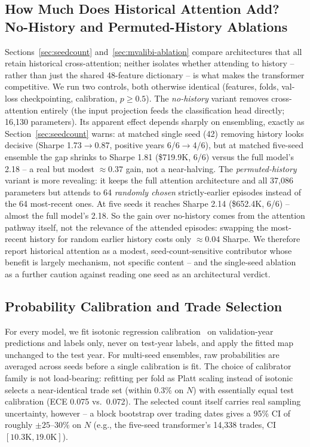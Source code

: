 \documentclass[sigconf,review,anonymous]{acmart}
\begin{document}
\subsection{How Much Does Historical Attention Add? No-History and Permuted-History Ablations}
\label{sec:nohistory}
Sections~\ref{sec:seedcount} and~\ref{sec:mvalibi-ablation} compare architectures that all retain historical cross-attention; neither isolates whether attending to history -- rather than just the shared 48-feature dictionary -- is what makes the transformer competitive. We run two controls, both otherwise identical (features, folds, val-loss checkpointing, calibration, $p\ge0.5$). The \emph{no-history} variant removes cross-attention entirely (the input projection feeds the classification head directly; 16{,}130 parameters). Its apparent effect depends sharply on ensembling, exactly as Section~\ref{sec:seedcount} warns: at matched single seed (42) removing history looks decisive (Sharpe 1.73$\to$0.87, positive years 6/6$\to$4/6), but at matched five-seed ensemble the gap shrinks to Sharpe 1.81 (\$719.9K, 6/6) versus the full model's 2.18 -- a real but modest $\approx0.37$ gain, not a near-halving. The \emph{permuted-history} variant is more revealing: it keeps the full attention architecture and all 37{,}086 parameters but attends to 64 \emph{randomly chosen} strictly-earlier episodes instead of the 64 most-recent ones. At five seeds it reaches Sharpe 2.14 (\$652.4K, 6/6) -- almost the full model's 2.18. So the gain over no-history comes from the attention pathway itself, not the relevance of the attended episodes: swapping the most-recent history for random earlier history costs only $\approx0.04$ Sharpe. We therefore report historical attention as a modest, seed-count-sensitive contributor whose benefit is largely mechanism, not specific content -- and the single-seed ablation as a further caution against reading one seed as an architectural verdict.

\subsection{Probability Calibration and Trade Selection}
\label{sec:calibration}
For every model, we fit isotonic regression calibration~\cite{zadrozny2002transforming} on validation-year predictions and labels only, never on test-year labels, and apply the fitted map unchanged to the test year. For multi-seed ensembles, raw probabilities are averaged across seeds before a single calibration is fit. The choice of calibrator family is not load-bearing: refitting per fold as Platt scaling instead of isotonic selects a near-identical trade set (within 0.3\% on $N$) with essentially equal test calibration (ECE 0.075 vs.\ 0.072). The selected count itself carries real sampling uncertainty, however -- a block bootstrap over trading dates gives a 95\% CI of roughly $\pm25$--$30\%$ on $N$ (e.g., the five-seed transformer's 14{,}338 trades, CI $[10.3\text{K}, 19.0\text{K}]$).
\end{document}

